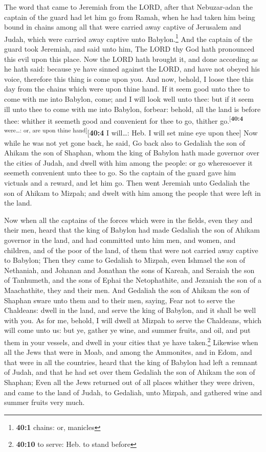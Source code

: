 The word that came to Jeremiah from the LORD, after that
Nebuzar-adan the captain of the guard had let him go from Ramah, when he
had taken him being bound in chains among all that were carried away
captive of Jerusalem and Judah, which were carried away captive unto
Babylon.\footnote{\textbf{40:1} chains: or, manicles}  And
the captain of the guard took Jeremiah, and said unto him, The LORD thy
God hath pronounced this evil upon this place.  Now the
LORD hath brought it, and done according as he hath said: because ye
have sinned against the LORD, and have not obeyed his voice, therefore
this thing is come upon you.  And now, behold, I loose
thee this day from the chains which were upon thine hand. If it seem
good unto thee to come with me into Babylon, come; and I will look well
unto thee: but if it seem ill unto thee to come with me into Babylon,
forbear: behold, all the land is before thee: whither it seemeth good
and convenient for thee to go, thither
go.\textsuperscript{{[}\textbf{40:4} were\ldots: or, are upon thine
hand{]}}{[}\textbf{40:4} I will\ldots: Heb. I will set mine eye upon
thee{]}  Now while he was not yet gone back, he said, Go
back also to Gedaliah the son of Ahikam the son of Shaphan, whom the
king of Babylon hath made governor over the cities of Judah, and dwell
with him among the people: or go wheresoever it seemeth convenient unto
thee to go. So the captain of the guard gave him victuals and a reward,
and let him go.  Then went Jeremiah unto Gedaliah the son
of Ahikam to Mizpah; and dwelt with him among the people that were left
in the land.

 Now when all the captains of the forces which were in the
fields, even they and their men, heard that the king of Babylon had made
Gedaliah the son of Ahikam governor in the land, and had committed unto
him men, and women, and children, and of the poor of the land, of them
that were not carried away captive to Babylon;  Then they
came to Gedaliah to Mizpah, even Ishmael the son of Nethaniah, and
Johanan and Jonathan the sons of Kareah, and Seraiah the son of
Tanhumeth, and the sons of Ephai the Netophathite, and Jezaniah the son
of a Maachathite, they and their men.  And Gedaliah the
son of Ahikam the son of Shaphan sware unto them and to their men,
saying, Fear not to serve the Chaldeans: dwell in the land, and serve
the king of Babylon, and it shall be well with you.  As
for me, behold, I will dwell at Mizpah to serve the Chaldeans, which
will come unto us: but ye, gather ye wine, and summer fruits, and oil,
and put them in your vessels, and dwell in your cities that ye have
taken.\footnote{\textbf{40:10} to serve: Heb. to stand before}
 Likewise when all the Jews that were in Moab, and among
the Ammonites, and in Edom, and that were in all the countries, heard
that the king of Babylon had left a remnant of Judah, and that he had
set over them Gedaliah the son of Ahikam the son of Shaphan;
 Even all the Jews returned out of all places whither
they were driven, and came to the land of Judah, to Gedaliah, unto
Mizpah, and gathered wine and summer fruits very much.


